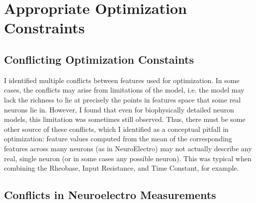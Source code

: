 \section{Appropriate Optimization Constraints}
\subsection{Conflicting Optimization Constaints}
I identified multiple conflicts between features used for optimization.
In some cases, the conflicts may arise from limitations of the model, i.e. the model may lack the richness to lie at precisely the points in features space that some real neurons lie in.
However, I found that even for biophysically detailed neuron models, this limitation was sometimes still observed.
Thus, there must be some other source of these conflicts, which I identified as a conceptual pitfall in optimization: feature values computed from the mean of the corresponding features across many neurons (as in NeuroElectro) may not actually describe any real, single neuron (or in some cases any possible neuron). 
This was typical when combining the Rheobase, Input Resistance, and Time Constant, for example.

\subsection{Conflicts in Neuroelectro Measurements}
% 






